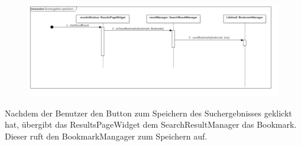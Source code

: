 \begin{figure}[H]
\centering
\includegraphics[width=\linewidth]{img/Sequenzdiagramme/SuchergebnisSpeichern}
\label{fig:suchergebnisSpeichern}
\end{figure}
Nachdem der Benutzer den Button zum Speichern des Suchergebnisses geklickt hat, übergibt das ResultsPageWidget dem SearchResultManager das Bookmark. Dieser ruft den BookmarkMangager zum Speichern auf.